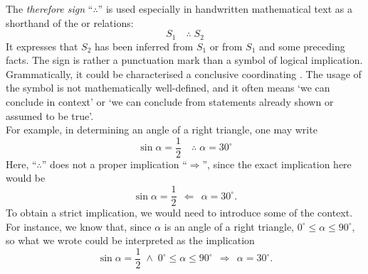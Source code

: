 \documentclass[12pt]{article}
\theoremstyle{definition}
\begin{document}
The {\em therefore sign} ``$\therefore$'' is used especially in handwritten mathematical text as a shorthand of the  or relations:
$$S_1 \quad \therefore \; S_2$$
It expresses that $S_2$ has been inferred from $S_1$ or from $S_1$ and some preceding facts.  The sign is rather a punctuation mark than a symbol of logical implication.  Grammatically, it could be characterised a conclusive coordinating .  The usage of the symbol is not mathematically well-defined, and it often means `we can conclude in context' or `we can conclude from statements already shown or assumed to be true'.\\

For example, in determining an angle of a right triangle, one may write
$$\sin\alpha = \frac{1}{2} \quad \therefore \; \alpha = 30^\circ$$
Here, ``$\therefore$'' does not  a proper implication ``$\Rightarrow$'', since the exact implication here would be
$$\sin\alpha = \frac{1}{2} \;\, \Leftarrow \;\, \alpha = 30^\circ.$$
To obtain a strict implication, we would need to introduce some of the context.
For instance, we know that, since $\alpha$ is an angle of a right triangle,
$0^\circ \le \alpha \le 90^\circ$,
so what we wrote could be interpreted as the implication
$$\sin\alpha = \frac{1}{2} \; \land \;
  0^\circ \le \alpha \le 90^\circ
  \;\, \Rightarrow \;\, \alpha = 30^\circ.$$
\end{document}
